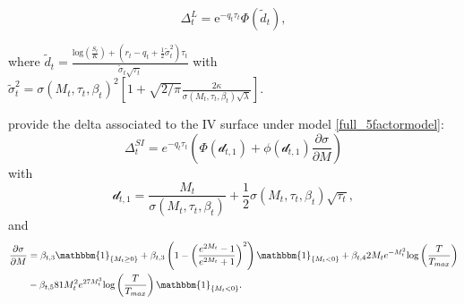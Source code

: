 \documentclass[12pt]{article}
\begin{document}
\begin{equation*}
    \Delta_{t}^{L}= \mbox{e}^{-q_{t}\tau_{t}}\Phi\left(\tilde{d}_{t} \right),
\end{equation*}

where $\tilde{d}_{t}=\frac{\mbox{log}\left( \frac{S_{t}}{K} \right)+\left( r_{t}-q_{t}+\frac{1}{2}\tilde{\sigma}_{t}^2 \right)\tau_{t}}{\tilde{\sigma}_{t} \sqrt{\tau_{t}}}$ with $\tilde{\sigma}_{t}^{2} = \sigma (M_{t},\tau_{t},\beta_{t})^{2}\left[ 1+\sqrt{2/\pi}\frac{2\kappa}{\sigma (M_{t},\tau_{t},\beta_{t})\sqrt{\lambda}}\right]$.


\cite{Frnacois2022} provide the delta associated to the IV surface under model \eqref{full_5factormodel}:
\begin{equation*}
    \Delta_{t}^{SI} = e^{-q_{t}\tau_{t}} \left( \Phi(\mathcal{d}_{t,1})+\phi(\mathcal{d}_{t,1})\frac{\partial \sigma}{\partial M} \right)
\end{equation*}
with
$$\mathcal{d}_{t,1}=\frac{M_{t}}{\sigma(M_{t},\tau_{t},\beta_{t})}+\frac{1}{2}\sigma(M_{t},\tau_{t},\beta_{t})\sqrt{\tau_{t}},$$
and
\begin{align*}
     \frac{\partial \sigma}{\partial M} &=\beta_{t,3}\mathbbm{1}_{\{M_{t}\geq 0\}}+\beta_{t,3}\left(1-  \left(\frac{e^{2M_{t}}-1}{e^{2M_{t}}+1}\right)^{2} \right)\mathbbm{1}_{\{M_{t}< 0\}}+\beta_{t,4}2M_{t}e^{-M_{t}^{2}}\mbox{log}\left(\frac{T}{T_{max}} \right)\\
     &-\beta_{t,5}81M_{t}^{2}e^{27M_{t}^{3}}\mbox{log}\left(\frac{T}{T_{max}} \right)\mathbbm{1}_{\{M_{t}< 0\}}.
 \end{align*}



\pagebreak

\end{document}
